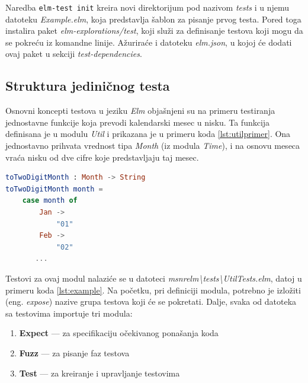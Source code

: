 \documentclass[12pt,oneside]{memoir}
\begin{document}
Naredba \texttt{elm-test init} kreira novi direktorijum pod nazivom \emph{tests} i u njemu datoteku \emph{Example.elm}, koja predstavlja šablon za pisanje prvog testa. Pored toga instalira paket \emph{elm-explorations/test}, koji služi za definisanje testova koji mogu da se pokreću iz komandne linije. Ažuriraće i datoteku \emph{elm.json}, u kojoj će dodati ovaj paket u sekciji \emph{test-dependencies}.

\subsection{Struktura jediničnog testa}

\par Osnovni koncepti testova u jeziku \emph{Elm} objašnjeni su na primeru testiranja jednostavne funkcije koja prevodi kalendarski mesec u nisku. Ta funkcija definisana je u modulu \emph{Util} i prikazana je u primeru koda \ref{lst:utilprimer}. Ona jednostavno prihvata vrednost tipa \emph{Month} (iz modula \emph{Time}), i na osnovu meseca vraća nisku od dve cifre koje predstavljaju taj mesec.

\begin{minipage}{\linewidth}
\begin{lstlisting}[language=elm, basicstyle=\small, caption={Funkcija \emph{toTwoDigitMonth}},captionpos=b, label={lst:utilprimer}]
toTwoDigitMonth : Month -> String
toTwoDigitMonth month =
    case month of
        Jan ->
            "01"
        Feb ->
            "02"
       ...
\end{lstlisting}
\end{minipage}

\par Testovi za ovaj modul nalaziće se u datoteci \emph{msnr{\textunderscore}elm{\textbackslash}tests{\textbackslash}UtilTests.elm}, datoj u primeru koda \ref{lst:example}. Na početku, pri definiciji modula, potrebno je izložiti (eng. \emph{expose}) nazive grupa testova koji će se pokretati. Dalje, svaka od datoteka sa testovima importuje tri modula: 

\begin{enumerate}
\item \textbf{Expect} --- za specifikaciju očekivanog ponašanja koda
\item \textbf{Fuzz} --- za pisanje faz testova 
\item \textbf{Test} --- za kreiranje i upravljanje testovima
\end{enumerate}
\end{document}
